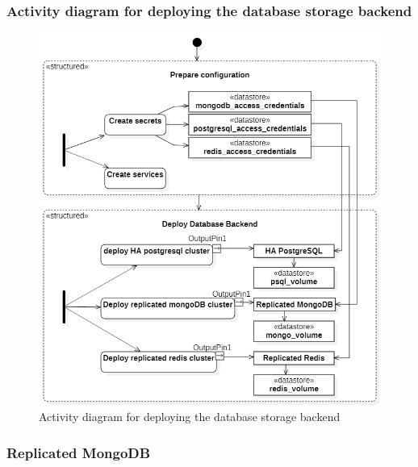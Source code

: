 \subsubsection{Activity diagram for deploying the database storage backend }
\begin{figure}[H]\centering
\includegraphics[width=1.0\textwidth,angle=00]{assets/f35.png}
\caption{Activity diagram for deploying the database storage backend}
\label{fig:Activity diagram for deploying the database storage backend}
\end{figure}

\subsubsection{Replicated MongoDB }

